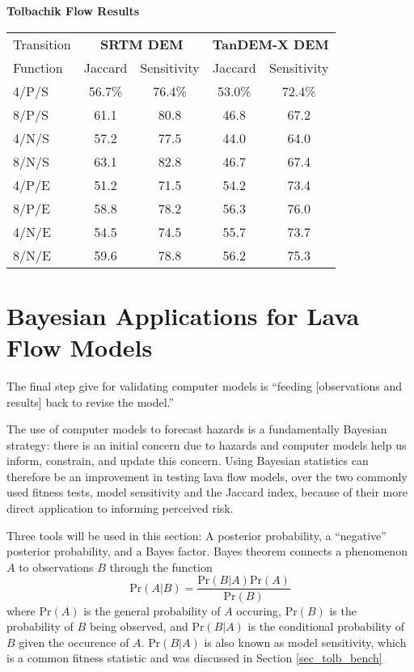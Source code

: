 		\begin{center}
			\textbf{Tolbachik Flow Results}\\
			\begin{tabular}{l c c | c c}
				\toprule
				Transition&\multicolumn{2}{c}{\textbf{SRTM DEM}}&\multicolumn{2}{c}{\textbf{TanDEM-X DEM}}\\
				Function& Jaccard & Sensitivity& Jaccard & Sensitivity\\
				\midrule
				4/P/S & 56.7\%& 76.4\%& 53.0\%& 72.4\% \\
				8/P/S & 61.1  & 80.8  & 46.8  & 67.2   \\
				4/N/S & 57.2  & 77.5  & 44.0  & 64.0   \\
				8/N/S & 63.1  & 82.8  & 46.7  & 67.4   \\
				4/P/E & 51.2  & 71.5  & 54.2  & 73.4   \\
				8/P/E & 58.8  & 78.2  & 56.3  & 76.0   \\
				4/N/E & 54.5  & 74.5  & 55.7  & 73.7   \\
				8/N/E & 59.6  & 78.8  & 56.2  & 75.3   \\
				
				\bottomrule
			\end{tabular}
		\end{center}


\section{Bayesian Applications for Lava Flow Models}\label{sec:Bayesian}
	The final step \citet{bayarri2007framework} give for validating computer models is ``feeding [observations and results] back to revise the model.''
	
	The use of computer models to forecast hazards is a fundamentally Bayesian strategy: there is an initial concern due to hazards and computer models help us inform, constrain, and update this concern. Using Bayesian statistics can therefore be an improvement in testing lava flow models, over the two commonly used fitness tests, model sensitivity and the Jaccard index, because of their more direct application to informing perceived risk. 
	
	Three tools will be used in this section: A posterior probability, a ``negative'' posterior probability, and a Bayes factor. Bayes theorem connects a phenomenon $A$ to observations $B$ through the function
	\begin{equation}
		\text{Pr}(A|B)=\frac{\text{Pr}(B|A)\text{Pr}(A)}{\text{Pr}(B)}\label{eq_bayes}
	\end{equation}
	where $\text{Pr}(A)$ is the general probability of $A$ occuring, $\text{Pr}(B)$ is the probability of $B$ being observed, and $\text{Pr}(B|A)$ is the conditional probability of $B$ given the occurence of $A$. $\text{Pr}(B|A)$ is also known as model sensitivity, which is a common fitness statistic and was discussed in Section \ref{sec_tolb_bench}
	
